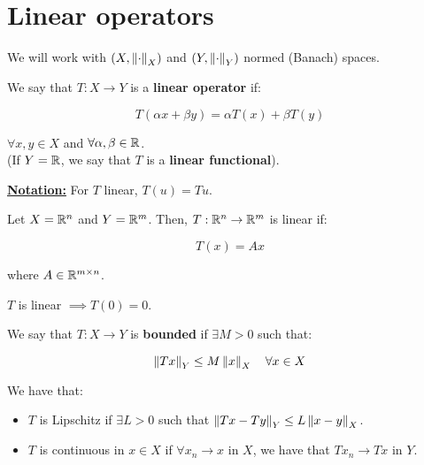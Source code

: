 \chapter{Linear operators}

\begin{note}
    We will work with $(X, \left\|\cdot\right\|_X)$ and $(Y, \left\|\cdot\right\|_Y)$ 
    normed (Banach) spaces.
\end{note}

\begin{fdefinition}
    We say that $T: X \to Y$ is a \textbf{linear operator} if:

    $$T(\alpha x + \beta y) = \alpha T(x) + \beta T(y)$$

    $\forall x, y \in X$ and $\forall \alpha, \beta \in \mathbb{R}$.\\

    (If $Y = \mathbb{R}$, we say that $T$ is a \textbf{linear functional}).
\end{fdefinition}

\vspace{1em}

\textbf{\underline{Notation:}} For $T$ linear, $T(u) = Tu$.

\begin{example}
    Let $X = \mathbb{R}^n$ and $Y = \mathbb{R}^m$. Then, $T: \mathbb{R}^n \to \mathbb{R}^m$ is linear if:

    $$T(x) = Ax$$

    where $A \in \mathbb{R}^{m \times n}$.
\end{example}

\begin{fremark}
    $T$ is linear $\implies T(0) = 0$.
\end{fremark}

\begin{fdefinition}
    We say that $T: X \to Y$ is \textbf{bounded} if $\exists M > 0$ such that:

    $$\left\|Tx\right\|_Y \leq M \left\|x\right\|_X \quad \forall x \in X$$
\end{fdefinition}

\vspace{1em}

\begin{fnote}[Recall]
    We have that:
    \vspace{1em}
    \begin{itemize}
        \item $T$ is Lipschitz if $\exists L > 0$ such that $\left\|Tx - Ty\right\|_Y \leq L \left\|x - y\right\|_X$.
        \vspace{1em}
        \item $T$ is continuous in $x \in X$ if $\forall x_n \to x$ in $X$, we have that $Tx_n \to Tx$ in $Y$.
    \end{itemize}
    
\end{fnote}

